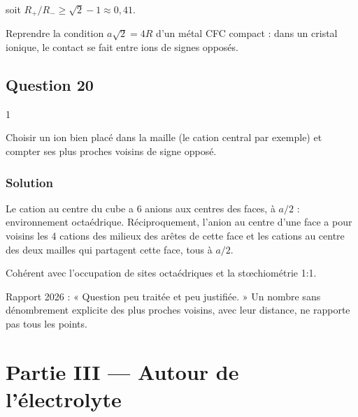 \documentclass[11pt,a4paper]{article}
\renewcommand{\geq}{\geqslant}
\newcommand{\equationajustee}[1]{%
  \sbox{\boiteequation}{$\displaystyle #1$}%
  \ifdim\wd\boiteequation>\linewidth
    \[\resizebox{\linewidth}{!}{\usebox{\boiteequation}}\]%
  \else
    \[#1\]%
  \fi}
\begin{document}
soit \(R_+/R_- \geq \sqrt2 - 1 \approx 0{,}41\).

\begin{piege}

Reprendre la condition \(a\sqrt2 = 4R\) d'un métal CFC compact : dans un cristal ionique, le contact se fait entre ions de signes opposés.

\end{piege}

\hypertarget{question-20}{%
\subsection{Question 20}\label{question-20}}

\begin{indication}{1}

Choisir un ion bien placé dans la maille (le cation central par exemple) et compter ses plus proches voisins de signe opposé.

\end{indication}

\hypertarget{solution-19}{%
\subsubsection{Solution}\label{solution-19}}

Le cation au centre du cube a 6 anions aux centres des faces, à \(a/2\) : environnement octaédrique. Réciproquement, l'anion au centre d'une face a pour voisins les 4 cations des milieux des arêtes de cette face et les cations au centre des deux mailles qui partagent cette face, tous à \(a/2\).

\equationajustee{\boxed{\text{coordinence 6-6}}}

Cohérent avec l'occupation de sites octaédriques et la stœchiométrie 1:1.

\begin{jury}

Rapport 2026 : « Question peu traitée et peu justifiée. » Un nombre sans dénombrement explicite des plus proches voisins, avec leur distance, ne rapporte pas tous les points.

\end{jury}

\hypertarget{partie-iii-autour-de-luxe9lectrolyte}{%
\section{Partie III --- Autour de l'électrolyte}\label{partie-iii-autour-de-luxe9lectrolyte}}
\end{document}
